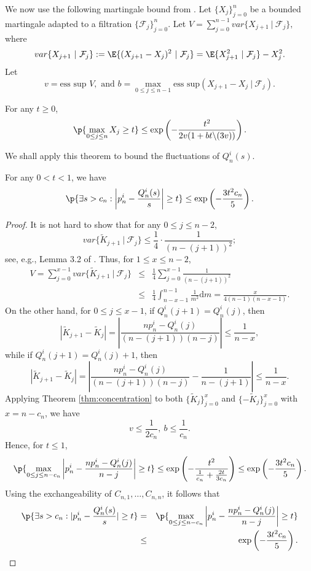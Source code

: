 We now use the following martingale bound from \cite{McDiarmid1998}. Let $\{X_j\}_{j=0}^n$ be a bounded martingale adapted to a filtration $\{\mathcal{F}_j\}_{j=0}^n$. Let $V=\sum\limits_{j=0}^{n-1}var\{X_{j+1}~|~\mathcal{F}_j\},$ where
$$var\{X_{j+1}~|~\mathcal{F}_j\}:=\E{(X_{j+1}-X_j)^2~|~\mathcal{F}_j}=\E{X_{j+1}^2~|~\mathcal{F}_j}-X_j^2.$$ Let $$v=\mbox{ess sup }V, \mbox{ and }b=\max\limits_{0\le j\le n-1}\mbox{ess sup}(X_{j+1}-X_j~|~\mathcal{F}_j).$$

\begin{thm}\label{thm:concentration}
For any $t\ge 0$,
$$\p{\max\limits_{0\le j\le n} X_j\ge t}\le \exp \left(-\frac{t^2}{2v(1+bt\backslash(3v))}\right).$$
\end{thm}
We shall apply this theorem to bound the fluctuations of $Q^i_n(s)$.
\begin{prop}\label{prop: martingale_concentration}
For any $0<t<1$, we have
\begin{equation}%
\p{\exists s>c_n: \left|p^i_n-\frac{Q^i_n(s)}{s}\right |\ge t}\le\exp\left(-\frac{3t^2c_n}{5}\right).
\end{equation} 
\end{prop}
\begin{proof}
It is not hard to show that for any $0\le j\le n-2$, \[var\{\tilde{K}_{j+1}~|~\mathcal{F}_j\}\le\frac{1}{4}\cdot\frac{1}{(n-(j+1))^2};\] see, e.g., Lemma 3.2 of \cite{Lei2017+}. Thus, for $1\le x\le n-2$,
\begin{eqnarray*}
V=\sum\limits_{j=0}^{x-1}var\{\tilde{K}_{j+1}~|~\mathcal{F}_j\}&\le&\frac{1}{4}
\sum_{j=0}^{x-1}\frac{1}{(n-(j+1))^2}\\
&\le&\frac{1}{4}\int^{n-1}_{n-x-1}\frac{1}{m^2}\mathrm{d}m=\frac{x}{4(n-1)(n-x-1)}.
\end{eqnarray*}
On the other hand, for $0\le j\le x-1$, if $Q^i_n(j+1)=Q^i_n(j)$, then \[|\tilde{K}_{j+1}-\tilde{K}_j|=\left|\frac{np^i_n-Q^i_n(j)}{(n-(j+1))(n-j)}\right|\le \frac{1}{n-x},\]
while if $Q^i_n(j+1)=Q^i_n(j)+1$, then \[|\tilde{K}_{j+1}-\tilde{K}_j|=\left|\frac{np^i_n-Q^i_n(j)}{(n-(j+1))(n-j)}-\frac{1}{n-(j+1)}\right|\le\frac{1}{n-x}.\]
Applying Theorem \ref{thm:concentration} to both $\{\tilde{K}_j\}^x_{j=0}$ and $\{-\tilde{K}_j\}^x_{j=0}$ with 
$x=n-c_n$, we have
\[v\le \frac{1}{2c_n},~ b\le \frac{1}{c_n}.\]
Hence, for $t \le 1$, 
\[\p{\max\limits_{0\le j\le n-c_n}\left|p^i_n-\frac{np^i_n-Q^i_n(j)}{n-j}\right|\ge t}\le\exp\left(-\frac{t^2}{\frac{1}{c_n}+\frac{2t}{3c_n}}\right)\le\exp\left(-\frac{3t^2c_n}{5}\right).\]
Using the exchangeability of $C_{n,1},\ldots,C_{n,n}$, it follows that
\begin{eqnarray*}
\p{\exists s>c_n: |p^i_n-\frac{Q^i_n(s)}{s}|\ge t}&=&\p{\max\limits_{0\le j\le n-c_n}\left|p^i_n-\frac{np^i_n-Q^i_n(j)}{n-j}\right|\ge t}\\
&\le&\exp\left(-\frac{3t^2c_n}{5}\right).
\end{eqnarray*}
\end{proof}

